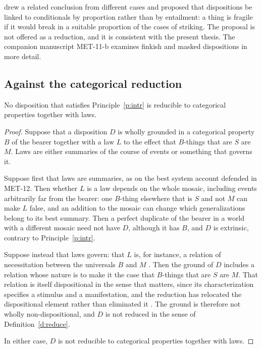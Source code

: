 \documentclass{situationist-preprint}
\begin{document}
\citet{ManleyWasserman2008} drew a related conclusion from different cases and proposed that dispositions be linked to conditionals by proportion rather than by entailment: a thing is fragile if it would break in a suitable proportion of the cases of striking. The proposal is not offered as a reduction, and it is consistent with the present thesis. The companion manuscript MET-11-b examines finkish and masked dispositions in more detail.

\subsection{Against the categorical reduction}

\begin{lemma}\label{l:cat}
No disposition that satisfies Principle~\ref{p:intr} is reducible to categorical properties together with laws.
\end{lemma}

\begin{proof}
Suppose that a disposition $D$ is wholly grounded in a categorical property $B$ of the bearer together with a law $L$ to the effect that $B$-things that are $S$ are $M$. Laws are either summaries of the course of events or something that governs it.

Suppose first that laws are summaries, as on the best system account defended in MET-12. Then whether $L$ is a law depends on the whole mosaic, including events arbitrarily far from the bearer: one $B$-thing elsewhere that is $S$ and not $M$ can make $L$ false, and an addition to the mosaic can change which generalizations belong to its best summary. Then a perfect duplicate of the bearer in a world with a different mosaic need not have $D$, although it has $B$, and $D$ is extrinsic, contrary to Principle~\ref{p:intr}.

Suppose instead that laws govern: that $L$ is, for instance, a relation of necessitation between the universals $B$ and $M$ \citep{Armstrong1983}. Then the ground of $D$ includes a relation whose nature is to make it the case that $B$-things that are $S$ are $M$. That relation is itself dispositional in the sense that matters, since its characterization specifies a stimulus and a manifestation, and the reduction has relocated the dispositional element rather than eliminated it \citep{Mumford2004}. The ground is therefore not wholly non-dispositional, and $D$ is not reduced in the sense of Definition~\ref{d:reduce}.

In either case, $D$ is not reducible to categorical properties together with laws.
\end{proof}
\end{document}
